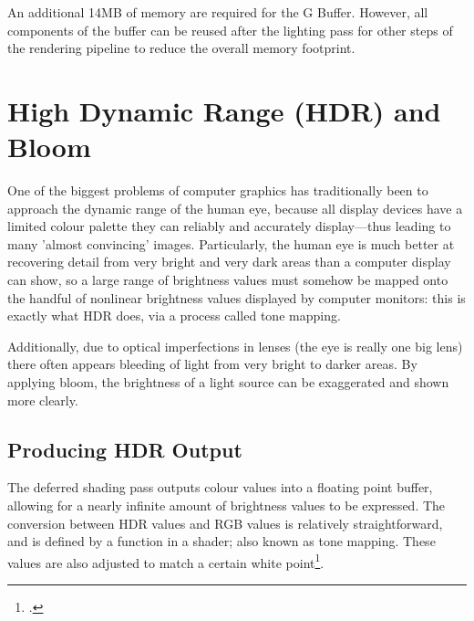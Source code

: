 \documentclass[11pt, oneside]{report}
\begin{document}
An additional 14MB of memory are required for the \gls{G Buffer}. However, all components of the buffer can be reused after the lighting pass for other steps of the rendering pipeline to reduce the overall memory footprint.


\chapter{High Dynamic Range (HDR) and Bloom}
One of the biggest problems of computer graphics has traditionally been to approach the dynamic range of the human eye, because all display devices have a limited colour palette they can reliably and accurately display---thus leading to many 'almost convincing' images. Particularly, the human eye is much better at recovering detail from very bright and very dark areas than a computer display can show, so a large range of brightness values must somehow be mapped onto the handful of nonlinear brightness values displayed by computer monitors: this is exactly what \gls{HDR} does, via a process called \gls{tone mapping}.

Additionally, due to optical imperfections in lenses (the eye is really one big lens) there often appears bleeding of light from very bright to darker areas. By applying \gls{bloom}, the brightness of a light source can be exaggerated and shown more clearly.

\section{Producing HDR Output}
The deferred shading pass outputs colour values into a \gls{floating point} buffer, allowing for a nearly infinite amount of brightness values to be expressed. The conversion between HDR values and \gls{RGB} values is relatively straightforward, and is defined by a function in a \gls{shader}; also known as \gls{tone mapping}. These values are also adjusted to match a certain \gls{white point}\footcite{hdr}.
\end{document}
